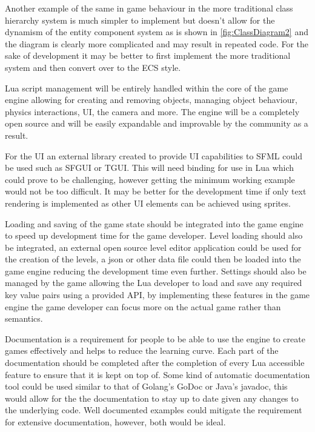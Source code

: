 \documentclass[11pt,a4paper,titlepage]{report}
\begin{document}
	Another example of the same in game behaviour in the more traditional class hierarchy system is much simpler to implement but doesn't allow for the dynamism of the entity component system as is shown in \ref{fig:ClassDiagram2} and the diagram is clearly more complicated and may result in repeated code. For the sake of development it may be better to first implement the more traditional system and then convert over to the ECS style.

	Lua script management will be entirely handled within the core of the game engine allowing for creating and removing objects, managing object behaviour, physics interactions, UI, the camera and more. The engine will be a completely open source and will be easily expandable and improvable by the community as a result.

	For the UI an external library created to provide UI capabilities to SFML could be used such as SFGUI or TGUI. This will need binding for use in Lua which could prove to be challenging, however getting the minimum working example would not be too difficult. It may be better for the development time if only text rendering is implemented as other UI elements can be achieved using sprites.

	Loading and saving of the game state should be integrated into the game engine to speed up development time for the game developer. Level loading should also be integrated, an external open source level editor application could be used for the creation of the levels, a json or other data file could then be loaded into the game engine reducing the development time even further. Settings should also be managed by the game allowing the Lua developer to load and save any required key value pairs using a provided API, by implementing these features in the game engine the game developer can focus more on the actual game rather than semantics.

	Documentation is a requirement for people to be able to use the engine to create games effectively and helps to reduce the learning curve. Each part of the documentation should be completed after the completion of every Lua accessible feature to ensure that it is kept on top of. Some kind of automatic documentation tool could be used similar to that of Golang's GoDoc or Java's javadoc, this would allow for the the documentation to stay up to date given any changes to the underlying code. Well documented examples could mitigate the requirement for extensive documentation, however, both would be ideal.
\end{document}
